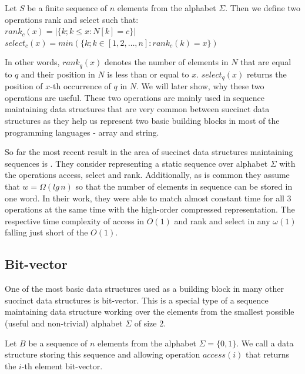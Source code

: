 \begin{definition}
Let $S$ be a finite sequence of $n$ elements from the alphabet $\Sigma$.
Then we define two operations rank and select such that: \\
$rank_c(x) = | \{k; k\leq x: N[k] = c  \} |$ \\
$select_c(x) = min (\{k; k \in [ 1, 2, \ldots, n] : rank_c(k)=x  \}) $
\end{definition}

In other words, $rank_q(x)$ denotes the number of elements in $N$ that are equal to $q$ and their position in $N$ is less than or equal to $x$. $select_q(x)$ returns the position of $x$-th occurrence of $q$ in $N$. We will later show, why these two operations are useful. These two operations are mainly used in sequence maintaining data structures that are very common between succinct data structures as they help us represent two basic building blocks in most of the programming languages - array and string.

So far the most recent result in the area of succinct data structures maintaining sequences is \cite{belazzougui2015optimal}. They consider representing a static sequence over alphabet $\Sigma$ with the operations access, select and rank. Additionally, as is common they assume that $w=\Omega(lg\,n)$ so that the number of elements in sequence can be stored in one word. In their work, they were able to match almost constant time for all 3 operations at the same time with the high-order compressed representation. The respective time complexity of access in $O(1)$ and rank and select in any $\omega(1)$ falling just short of the $O(1)$.

\subsection{Bit-vector}

One of the most basic data structures used as a building block in many other succinct data structures is bit-vector. This is a special type of a sequence maintaining data structure working over the elements from the smallest possible (useful and non-trivial) alphabet $\Sigma$ of size 2.

\begin{definition}
Let $B$ be a sequence of $n$ elements from the alphabet $\Sigma = \{0, 1\}$. We call a data structure storing this sequence
and allowing operation $access(i)$ that returns the $i$-th element bit-vector.
\end{definition}

